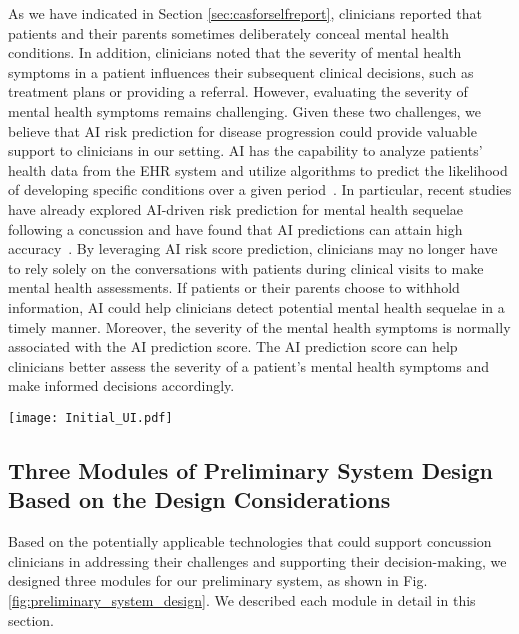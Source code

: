As we have indicated in Section \ref{sec:casforselfreport}, clinicians reported that patients and their parents sometimes deliberately conceal mental health conditions. 
In addition, clinicians noted that the severity of mental health symptoms in a patient influences their subsequent clinical decisions, such as treatment plans or providing a referral. 
However, evaluating the severity of mental health symptoms remains challenging.
Given these two challenges, we believe that AI risk prediction for disease progression could provide valuable support to clinicians in our setting. 
AI has the capability to analyze patients' health data from the EHR system and utilize algorithms to predict the likelihood of developing specific conditions over a given period~\cite{collins2019reporting}. 
In particular, recent studies have already explored AI-driven risk prediction for mental health sequelae following a concussion and have found that AI predictions can attain high accuracy~\cite{dabek2022evaluation}.
By leveraging AI risk score prediction, clinicians may no longer have to rely solely on the conversations with patients during clinical visits to make mental health assessments. 
If patients or their parents choose to withhold information, AI could help clinicians detect potential mental health sequelae in a timely manner. 
Moreover, the severity of the mental health symptoms is normally associated with the AI prediction score. 
The AI prediction score can help clinicians better assess the severity of a patient's mental health symptoms and make informed decisions accordingly.



\begin{figure*}[htbp]
  \texttt{[image: Initial\_UI.pdf]}
  \caption{The preliminary system design based on concussion clinicians' challenges and needs: (A) AI risk score prediction for mental health sequelae, (B) patient self-report symptoms, (C) patient sleep and physical activities.}
  \label{fig:preliminary_system_design}
\end{figure*}

\subsection{Three Modules of Preliminary System Design Based on the Design Considerations}
Based on the potentially applicable technologies that could support concussion clinicians in addressing their challenges and supporting their decision-making, we designed three modules for our preliminary system, as shown in Fig. \ref{fig:preliminary_system_design}. 
We described each module in detail in this section.


